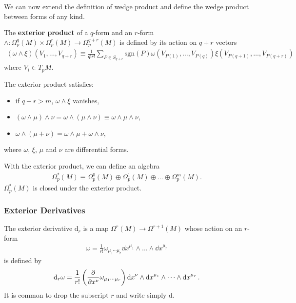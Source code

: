 \documentclass[10pt]{article}
\begin{document}
We can now extend the definition of wedge product and define the wedge product between forms of any kind.
\begin{definition}
    The \textbf{exterior product} of a $q$-form and an $r$-form $\wedge:\Omega^q_p(M)\times\Omega^r_p(M)\to\Omega^{q+r}_p(M)$ is defined by its action on $q+r$ vectors
    \begin{align}
        (\omega\wedge\xi)(V_1,\dots,V_{q+r})\equiv\frac{1}{q!r!}\sum_{P\in S_{q+r}}\text{sgn}(P)\omega(V_{P(1)},\dots,V_{P(q)})\xi(V_{P(q+1)},\dots,V_{P(q+r)})
    \end{align}
    where $V_i\in T_p M$.
\end{definition}
\begin{property}
    The exterior product satisfies:
    \begin{itemize}
        \item if $q+r>m$, $\omega\wedge\xi$ vanishes,
        \item $(\omega\wedge\mu)\wedge\nu=\omega\wedge(\mu\wedge\nu)\equiv\omega\wedge\mu\wedge\nu$,
        \item $\omega\wedge(\mu+\nu)=\omega\wedge\mu+\omega\wedge\nu$,
    \end{itemize}
    where $\omega$, $\xi$, $\mu$ and $\nu$ are differential forms.
\end{property}

With the exterior product, we can define an algebra
\begin{align}
    \Omega^*_p(M)\equiv \Omega^0_p(M)\oplus\Omega^1_p(M)\oplus\dots\oplus\Omega^m_p(M).
\end{align}
$\Omega^*_p(M)$ is closed under the exterior product.


\subsubsection{Exterior Derivatives}
\begin{definition}
    The exterior derivative $\text{d}_r$ is a map $\Omega^r(M)\to\Omega^{r+1}(M)$ whose action on an $r$-form
    \begin{align}
        \omega=\frac{1}{r!}\omega_{\mu_1\cdots\mu_r}\dd{x}^{\mu_1}\wedge\dots\wedge\dd{x}^{\mu_r}
    \end{align}
    is defined by
    \begin{align}
        \text{d}_r \omega=\frac{1}{r!}\left(\pdv{x^\nu}\omega_{\mu_1\cdots\mu_r}\right)\dd{x}^\nu\wedge\dd{x}^{\mu_1}\wedge\dots\wedge\dd{x}^{\mu_r}.
    \end{align}
    It is common to drop the subscript $r$ and write simply $\text{d}$.
\end{definition}
\end{document}
